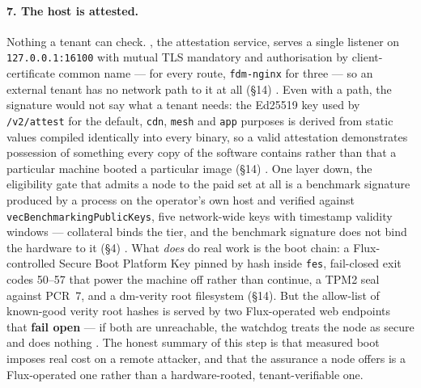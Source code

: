 \paragraph{7. The host is attested.}
Nothing a tenant can check. \fluxsas, the attestation service, serves a single listener on
\texttt{127.0.0.1:\allowbreak{}16100} with mutual TLS mandatory and authorisation by client-certificate common
name --- \fluxbench for every route, \texttt{fdm-nginx} for three --- so an external tenant has no
network path to it at all (\S14) . Even with
a path, the signature would not say what a tenant needs: the Ed25519 key used by \texttt{/v2/attest}
for the default, \texttt{cdn}, \texttt{mesh} and \texttt{app} purposes is derived from static values
compiled identically into every \fluxsas binary, so a valid attestation demonstrates possession of
something every copy of the software contains rather than that a particular machine booted a
particular image (\S14) . One layer down, the eligibility
gate that admits a node to the paid set at all is a benchmark signature produced by a process on the
operator's own host and verified against \texttt{vec\allowbreak{}Benchmarking\allowbreak{}Public\allowbreak{}Keys}, five network-wide keys
with timestamp validity windows --- collateral binds the tier, and the benchmark signature does not
bind the hardware to it (\S4) . What \emph{does} do real
work is the boot chain: a Flux-controlled Secure Boot Platform Key pinned by hash inside \texttt{fes},
fail-closed exit codes \num{50}--\num{57} that power the machine off rather than continue, a TPM2
seal against PCR~7, and a dm-verity root filesystem (\S14). But the allow-list of known-good verity
root hashes is served by two Flux-operated web endpoints that \textbf{fail open} --- if both are
unreachable, the watchdog treats the node as secure and does nothing
. The honest summary of this step is that measured boot
imposes real cost on a remote attacker, and that the assurance a node offers is a Flux-operated one
rather than a hardware-rooted, tenant-verifiable one.

